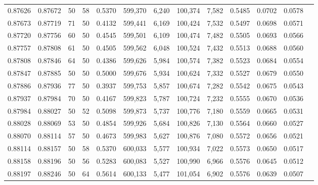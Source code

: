 \begin{tabular}{rrrrrrrrrrrrr}
0.87626 & 0.87672 &    50 &  58 &                                     0.5370 & 599,370 &   6,240 & 100,374 &   7,582 & 0.5485 & 0.0702 & 0.0578 \\
0.87673 & 0.87719 &    71 &  50 &                                     0.4132 & 599,441 &   6,169 & 100,424 &   7,532 & 0.5497 & 0.0698 & 0.0571 \\
0.87720 & 0.87756 &    60 &  50 &                                     0.4545 & 599,501 &   6,109 & 100,474 &   7,482 & 0.5505 & 0.0693 & 0.0566 \\
0.87757 & 0.87808 &    61 &  50 &                                     0.4505 & 599,562 &   6,048 & 100,524 &   7,432 & 0.5513 & 0.0688 & 0.0560 \\
0.87808 & 0.87846 &    64 &  50 &                                     0.4386 & 599,626 &   5,984 & 100,574 &   7,382 & 0.5523 & 0.0684 & 0.0554 \\
0.87847 & 0.87885 &    50 &  50 &                                     0.5000 & 599,676 &   5,934 & 100,624 &   7,332 & 0.5527 & 0.0679 & 0.0550 \\
0.87886 & 0.87936 &    77 &  50 &                                     0.3937 & 599,753 &   5,857 & 100,674 &   7,282 & 0.5542 & 0.0675 & 0.0543 \\
0.87937 & 0.87984 &    70 &  50 &                                     0.4167 & 599,823 &   5,787 & 100,724 &   7,232 & 0.5555 & 0.0670 & 0.0536 \\
0.87984 & 0.88027 &    50 &  52 &                                     0.5098 & 599,873 &   5,737 & 100,776 &   7,180 & 0.5559 & 0.0665 & 0.0531 \\
0.88028 & 0.88069 &    53 &  50 &                                     0.4854 & 599,926 &   5,684 & 100,826 &   7,130 & 0.5564 & 0.0660 & 0.0527 \\
0.88070 & 0.88114 &    57 &  50 &                                     0.4673 & 599,983 &   5,627 & 100,876 &   7,080 & 0.5572 & 0.0656 & 0.0521 \\
0.88114 & 0.88157 &    50 &  58 &                                     0.5370 & 600,033 &   5,577 & 100,934 &   7,022 & 0.5573 & 0.0650 & 0.0517 \\
0.88158 & 0.88196 &    50 &  56 &                                     0.5283 & 600,083 &   5,527 & 100,990 &   6,966 & 0.5576 & 0.0645 & 0.0512 \\
0.88197 & 0.88246 &    50 &  64 &                                     0.5614 & 600,133 &   5,477 & 101,054 &   6,902 & 0.5576 & 0.0639 & 0.0507 \\

\end{tabular}
